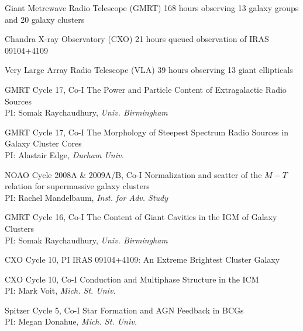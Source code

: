 \documentclass[12pt]{cv}
\begin{document}
\begin{llist}


Giant Metrewave Radio Telescope (GMRT)
168 hours observing 13 galaxy groups and 20 galaxy clusters

Chandra X-ray Observatory (CXO)
21 hours queued observation of IRAS 09104+4109

Very Large Array Radio Telescope (VLA)
39 hours observing 13 giant ellipticals



GMRT Cycle 17, Co-I
The Power and Particle Content of Extragalactic Radio Sources\\%
PI: Somak Raychaudhury, {\textit{Univ. Birmingham}}

GMRT Cycle 17, Co-I
The Morphology of Steepest Spectrum Radio Sources in Galaxy Cluster Cores\\%
PI: Alastair Edge, {\textit{Durham Univ.}}

NOAO Cycle 2008A \& 2009A/B, Co-I
Normalization and scatter of the $M-T$ relation for supermassive galaxy clusters\\
PI: Rachel Mandelbaum, {\textit{Inst. for Adv. Study}}

GMRT Cycle 16, Co-I
The Content of Giant Cavities in the IGM of Galaxy Clusters\\%
PI: Somak Raychaudhury, {\textit{Univ. Birmingham}}

CXO Cycle 10, PI
IRAS 09104+4109: An Extreme Brightest Cluster Galaxy%

CXO Cycle 10, Co-I
Conduction and Multiphase Structure in the ICM\\%
PI: Mark Voit, {\textit{Mich. St. Univ.}}

Spitzer Cycle 5, Co-I
Star Formation and AGN Feedback in BCGs\\%
PI: Megan Donahue, {\textit{Mich. St. Univ.}}


\end{llist}
\end{document}
